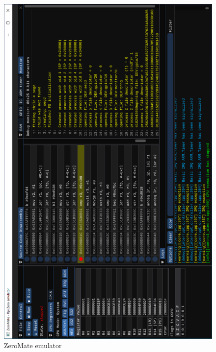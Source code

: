\documentclass[english, ing, kiv, he, iso690numb, pdf]{fasthesis}
\newcommand\blankpage{%
	\null
	\thispagestyle{empty}%
	\addtocounter{page}{-1}%
	\newpage}
\begin{document}
	\null
	\vfill
	
	\newpage
	
	\begin{figure}[ht]
		\centering
		\includegraphics[width=1.0\textwidth]{img/attachments/screenshot-01.pdf}
		\caption{ZeroMate emulator}
		\label{ZeroMate emulator}
	\end{figure}
	
	\afterpage{\blankpage}
	
	\backpage
\end{document}
